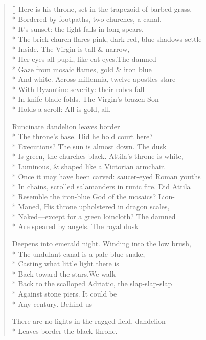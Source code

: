 \label{ch:venezia_torcello}
\settowidth{\versewidth}{In chains, scrolled salamanders in runic fire.   Did Attila}
\begin{verse}[\versewidth]
Here is his throne, set in the trapezoid of barbed grass,\\*
Bordered by footpaths, two churches, a canal.\\*
It's sunset: the light falls in long spears,\\*
The brick church flares pink, dark red, blue shadows settle\\*
Inside.    The Virgin is tall \& narrow,\\*
Her eyes all pupil, like cat eyes.\qquad The damned\\*
Gaze from mosaic flames, gold \& iron blue\\*
And white.   Across millennia, twelve apostles stare\\*
With Byzantine severity: their robes fall\\*
In knife-blade folds. The Virgin's brazen Son\\*
Holds a scroll: All is gold, all.

Runcinate dandelion leaves border\\*
The throne's base.   Did he hold court here?\\*
Executions?   The sun is almost down.   The dusk\\*
Is green, the churches black.   Attila's throne is white,\\*
Luminous, \& shaped like a Victorian armchair.\\*
Once it may have been carved: saucer-eyed Roman youths\\*
In chains, scrolled salamanders in runic fire.   Did Attila\\*
Resemble the iron-blue God of the mosaics? Lion-\\*
Maned, His throne upholstered in dragon scales,\\*
Naked---except for a green loincloth?   The damned\\*
Are speared by angels.   The royal dusk

Deepens into emerald night.  Winding into the low brush,\\*
The undulant canal is a pale blue snake,\\*
Casting what little light there is\\*
Back toward the stars.\qquad We walk\\*
Back to the scalloped Adriatic, the slap-slap-slap\\*
Against stone piers.    It could be\\*
Any century. Behind us

There are no lights in the ragged field, dandelion\\*
Leaves border the black throne.
\end{verse}
